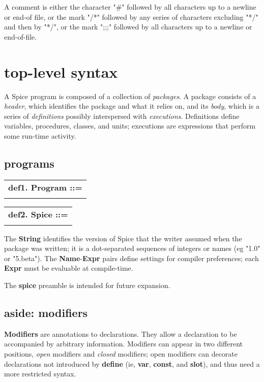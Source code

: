 \documentclass{report}
\begin{document}
A comment is either the character "\#"
followed by all characters up to a newline or
end-of file, or the mark "/*" followed by any series of characters excluding
"*/" and then by "*/", or the mark ";;;" followed by all characters up to a
newline or end-of-file.\chapter{top-level syntax}


A Spice program is composed of a collection of {\em packages}. A package
consists of a {\em header}, which identifies the package and what it relies
on, and its {\em body}, which is a series of {\em definitions} possibly
interspersed with {\em executions}. Definitions define variables,
procedures, classes, and units; executions are expressions
that perform some run-time activity.

\section{programs}


\begin{tabular}{l}
{\bf def1. Program ::= }\\ 
\hspace*{3mm}{\tt Spice (Package* $\mid$ PackageBody)} \\ 
\end{tabular}

\begin{tabular}{l}
{\bf def2. Spice ::= }\\ 
\hspace*{3mm}{\tt "spice" String ("," (Name ":" Expr))*} \\ 
\end{tabular}

The {\bf String} identifies the version of Spice that the writer assumed
when the package was written; it is a dot-separated sequences of
integers or names (eg "1.0" or "5.beta"). The {\bf Name}-{\bf Expr} pairs
define settings for compiler preferences; each {\bf Expr} must be
evaluable at compile-time.

The {\bf spice} preamble is intended for future expansion.\section{aside: modifiers}


{\bf Modifiers} are annotations to declarations. They allow a declaration to be
accompanied by arbitrary information. Modifiers can appear in two different
positions, {\em open} modifiers and {\em closed} modifiers; open modifiers can
decorate declarations not introduced by {\bf define} (ie, {\bf var}, {\bf const}, and
{\bf slot}), and thus need a more restricted syntax.
\end{document}
